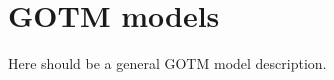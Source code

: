 \clearpage
\section{GOTM models\label{sec:GOTM_models}}

Here should be a general GOTM model description.

\cleardoublepage


\cleardoublepage


